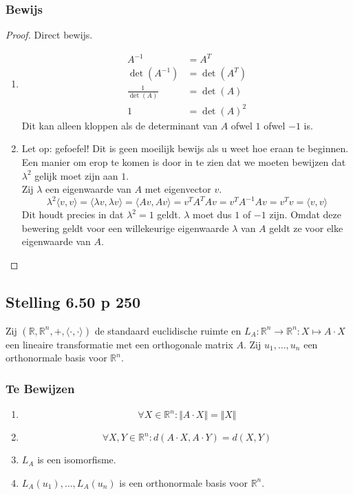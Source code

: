 \documentclass[lineaire_algebra_oplossingen.tex]{subfiles}
\begin{document}
\subsubsection*{Bewijs}
\begin{proof}
Direct bewijs.
\begin{enumerate}
\item
\begin{align*}
A^{-1} &= A^T \\
\det(A^{-1}) &= \det(A^T) \\
\frac{1}{\det(A)} &= \det(A) \\
1 &= \det(A)^2
\end{align*}
Dit kan alleen kloppen als de determinant van $A$ ofwel $1$ ofwel $-1$ is.

\item
Let op: gefoefel! Dit is geen moeilijk bewijs als u weet hoe eraan te beginnen. Een manier om erop te komen is door in te zien dat we moeten bewijzen dat $\lambda^2$ gelijk moet zijn aan $1$.\\
Zij $\lambda$ een eigenwaarde van $A$ met eigenvector $v$.
\[
\lambda^2\langle v,v\rangle = \langle \lambda v,\lambda v\rangle = \langle A v,A v\rangle = v^TA^T A v = v^TA^{-1} A v = v^Tv = \langle v, v \rangle
\]
Dit houdt precies in dat $\lambda^2 = 1$ geldt. $\lambda$ moet dus $1$ of $-1$ zijn. Omdat deze bewering geldt voor een willekeurige eigenwaarde $\lambda$ van $A$ geldt ze voor elke eigenwaarde van $A$.
\end{enumerate}
\end{proof}

\subsection{Stelling 6.50 p 250}
\label{6.50}
Zij $(\mathbb{R},\mathbb{R}^n,+,\langle \cdot , \cdot \rangle)$ de standaard euclidische ruimte   en $L_A : \mathbb{R}^n \rightarrow \mathbb{R}^n: X \mapsto A \cdot X$ een lineaire transformatie met een orthogonale matrix $A$. Zij $u_1,\ldots,u_n$ een orthonormale basis voor $\mathbb{R}^n$.

\subsubsection*{Te Bewijzen}
\begin{enumerate}
\item
\[
\forall X \in \mathbb{R}^n: \Vert A \cdot X \Vert = \Vert X \Vert
\]

\item
\[
\forall X,Y \in \mathbb{R}^n: d(A\cdot X,A\cdot Y) = d(X,Y)
\]

\item $L_A$ is een isomorfisme.

\item $L_A(u_1),\ldots,L_A(u_n)$ is een orthonormale basis voor $\mathbb{R}^n$.

\end{enumerate}
\end{document}
